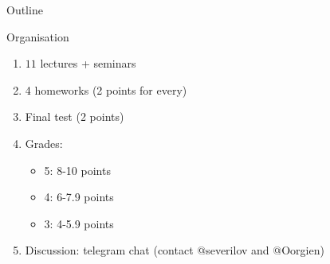 
\usepackage{tikz}
\usetikzlibrary{arrows,shapes,positioning,shadows,trees}

\begin{frame}
\titlepage
\end{frame}
\begin{frame}{Outline}
	\tableofcontents
\end{frame}
\begin{frame}{Organisation}
	\begin{enumerate}
		\item $11$ lectures + seminars
		\item 4 homeworks (2 points for every)
        \item Final test (2 points)
		\item Grades: 
            \begin{itemize}
                \item 5: 8-10 points
                \item 4: 6-7.9 points
                \item 3: 4-5.9 points
            \end{itemize}
		\item Discussion: telegram chat (contact @severilov and @Oorgien)
	\end{enumerate}
\end{frame}
